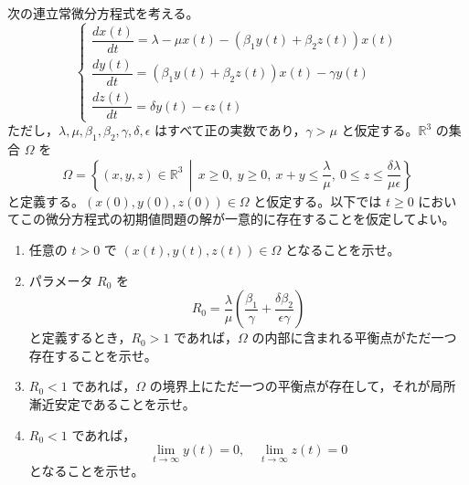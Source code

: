 \documentclass[12pt]{jlreq}
\begin{document}
次の連立常微分方程式を考える。
\[
  \begin{cases} \dfrac{dx(t)}{dt} = \lambda - \mu x(t) - (\beta_1 y(t) + \beta_2 z(t)) x(t) \\ \dfrac{dy(t)}{dt} = (\beta_1 y(t) + \beta_2 z(t)) x(t) - \gamma y(t) \\ \dfrac{dz(t)}{dt} = \delta y(t) - \epsilon z(t) \end{cases}
\]
ただし，$\lambda, \mu, \beta_1, \beta_2, \gamma, \delta, \epsilon$ はすべて正の実数であり，$\gamma > \mu$ と仮定する。$\mathbb{R}^3$ の集合 $\Omega$ を
\[
  \Omega = \left\{ (x,y,z) \in \mathbb{R}^3 \,\middle|\, x \ge 0,\ y \ge 0,\ x + y \le \frac{\lambda}{\mu},\ 0 \le z \le \frac{\delta\lambda}{\mu\epsilon} \right\}
\]
と定義する。$(x(0), y(0), z(0)) \in \Omega$ と仮定する。以下では $t \ge 0$ においてこの微分方程式の初期値問題の解が一意的に存在することを仮定してよい。

\begin{enumerate}
  \item 任意の $t > 0$ で $(x(t), y(t), z(t)) \in \Omega$ となることを示せ。
  \item パラメータ $R_0$ を
  \[
    R_0 = \frac{\lambda}{\mu}\left(\frac{\beta_1}{\gamma} + \frac{\delta\beta_2}{\epsilon\gamma}\right)
  \]
  と定義するとき，$R_0 > 1$ であれば，$\Omega$ の内部に含まれる平衡点がただ一つ存在することを示せ。
  \item $R_0 < 1$ であれば，$\Omega$ の境界上にただ一つの平衡点が存在して，それが局所漸近安定であることを示せ。
  \item $R_0 < 1$ であれば，
  \[
    \lim_{t \to \infty} y(t) = 0,\quad \lim_{t \to \infty} z(t) = 0
  \]
  となることを示せ。
\end{enumerate}
\end{document}
